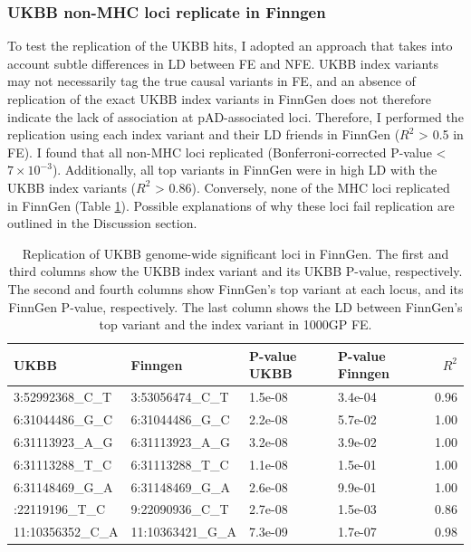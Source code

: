 \subsubsection{UKBB non-MHC loci replicate in Finngen}
To test the replication of the UKBB hits, I adopted an approach that takes into account subtle differences in LD between FE and NFE. UKBB index variants may not necessarily tag the true causal variants in FE, and an absence of replication of the exact UKBB index variants in FinnGen does not therefore indicate the lack of association at pAD-associated loci. Therefore, I performed the replication using each index variant and their LD friends in FinnGen ($R^{2}$ > 0.5 in FE). I found that all non-MHC loci replicated (Bonferroni-corrected P-value < $7\times10^{-3}$). Additionally, all top variants in FinnGen were in high LD with the UKBB index variants ($R^{2}$ > 0.86). Conversely, none of the MHC loci replicated in FinnGen (Table \ref{table:replication_ukbb_in_finngen}). Possible explanations of why these loci fail replication are outlined in the Discussion section. \\



\begin{table}[H]
  \caption{Replication of UKBB genome-wide significant loci in FinnGen. The first and third columns show the UKBB index variant and its UKBB P-value, respectively. The second and fourth columns show FinnGen's top variant at each locus, and its FinnGen P-value, respectively. The last column shows the LD between FinnGen's top variant and the index variant in 1000GP FE.}
  \label{table:replication_ukbb_in_finngen}
  \centering
  \begin{tabular}[t]{llllr}
  \toprule
  UKBB & Finngen & P-value UKBB & P-value Finngen & $R^{2}$\\
  \midrule
  3:52992368\_C\_T & 3:53056474\_C\_T & 1.5e-08 & 3.4e-04 & 0.96\\
  6:31044486\_G\_C & 6:31044486\_G\_C & 2.2e-08 & 5.7e-02 & 1.00\\
  6:31113923\_A\_G & 6:31113923\_A\_G & 3.2e-08 & 3.9e-02 & 1.00\\
  6:31113288\_T\_C & 6:31113288\_T\_C & 1.1e-08 & 1.5e-01 & 1.00\\
  6:31148469\_G\_A & 6:31148469\_G\_A & 2.6e-08 & 9.9e-01 & 1.00\\
  \addlinespace
  9:22119196\_T\_C & 9:22090936\_C\_T & 2.7e-08 & 1.5e-03 & 0.86\\
  11:10356352\_C\_A & 11:10363421\_G\_A & 7.3e-09 & 1.7e-07 & 0.98\\
  \bottomrule
  \end{tabular}
  \end{table}
